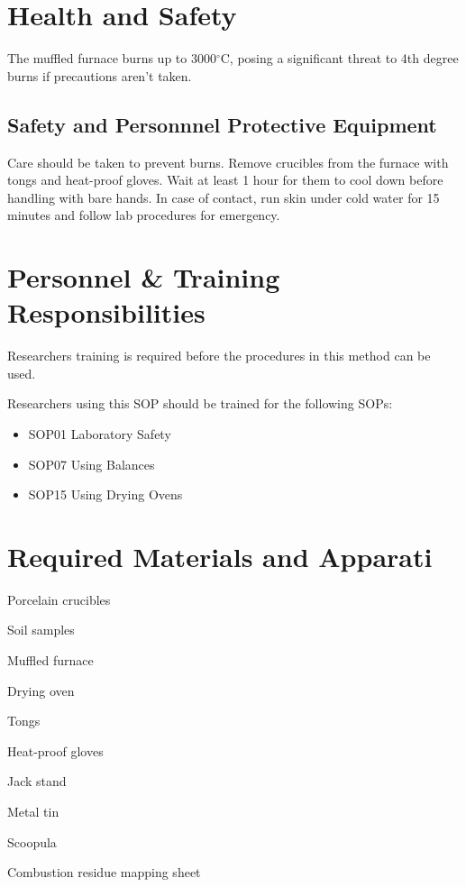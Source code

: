 \documentclass[12pt]{../SOP4_alpha}\usepackage[]{graphicx}\usepackage[]{xcolor}
\begin{document}
\section{Health and Safety}

\NP The muffled furnace burns up to 3000$^\circ$C, posing a significant threat to 4th degree burns if precautions aren't taken.

\subsection*{Safety and Personnnel Protective Equipment}

\NP Care should be taken to prevent burns. Remove crucibles from the furnace with tongs and heat-proof gloves. Wait at least 1 hour for them to cool down before handling with bare hands. In case of contact, run skin under cold water for 15 minutes and follow lab procedures for emergency. 

\section{Personnel \& Training Responsibilities}

\NP Researchers training is required before the procedures in this method can be used.

\NP Researchers using this SOP should be trained for the following SOPs:

\begin{itemize}
  \item SOP01 Laboratory Safety
  \item SOP07 Using Balances
  \item SOP15 Using Drying Ovens
\end{itemize}

\newpage 

\section{Required Materials and Apparati}

\begin{enumerate*}
	\item Porcelain crucibles
	\item Soil samples
	\item Muffled furnace
	\item Drying oven
	\item Tongs
	\item Heat-proof gloves
	\item Jack stand
	\item Metal tin
	\item Scoopula
	\item Combustion residue mapping sheet
\end{enumerate*}
\end{document}
